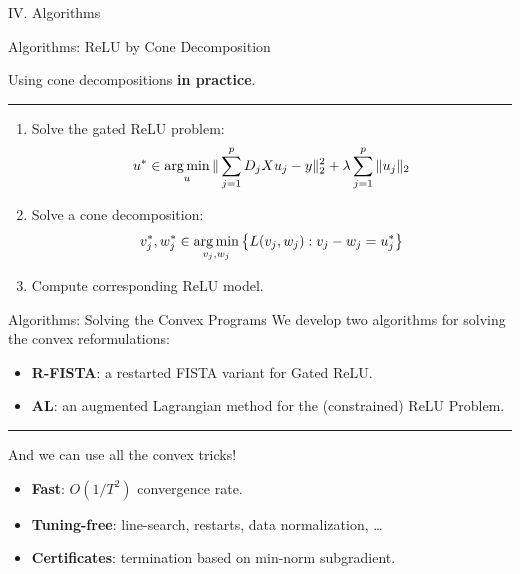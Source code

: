 \documentclass[usenames,dvipsnames,mathserif,notheorems]{beamer}
\newcommand{\horizontalrule}{
	{
			\vspace{-0.5em}
			\center \rule{\textwidth}{0.1em}
			\vspace{-0.2em}
		}
}
\begin{document}
\begin{frame}{}
	\begin{center}
		\huge IV. Algorithms
	\end{center}
\end{frame}

\begin{frame}{Algorithms: ReLU by Cone Decomposition}
	\begin{center}
		\large Using cone decompositions \textbf{in practice}.
	\end{center}

	\pause
	\horizontalrule

	\begin{enumerate}
		\item Solve the gated ReLU problem:
		      \[
			      u^* \in \mathop{\rm arg\,min}_{u} \|\sum_{j=1}^p D_j X u_j - y\|_2^2 + \lambda \sum_{j=1}^p \|u_j\|_2
		      \]
		      \pause
		\item Solve a cone decomposition:
		      \[
			      v_j^*, w_j^* \in \mathop{\rm arg\,min}_{v_j, w_j} \left\{ L(v_j, w_j) : v_j - w_j = u^*_j\right\}
		      \]
		      \pause

		\item Compute corresponding ReLU model.
	\end{enumerate}

\end{frame}

\begin{frame}{Algorithms: Solving the Convex Programs}
	We develop two algorithms for solving the convex reformulations:

	\vspace{1em}

	\begin{itemize}
		\item \textbf{R-FISTA}: a restarted FISTA variant for Gated ReLU.
		      \vspace{0.5em}
		\item \textbf{AL}: an augmented Lagrangian method for the (constrained) ReLU Problem.
	\end{itemize}

	\pause
	\horizontalrule

	And we can use all the convex tricks!
	\vspace{1em}
	\begin{itemize}
		\item \textbf{Fast}: \( O(1/T^2) \) convergence rate.
		      \vspace{0.5em}

		\item \textbf{Tuning-free}: line-search, restarts, data normalization, \ldots
		      \vspace{0.5em}

		\item \textbf{Certificates}: termination based on min-norm subgradient.
	\end{itemize}

\end{frame}
\end{document}
